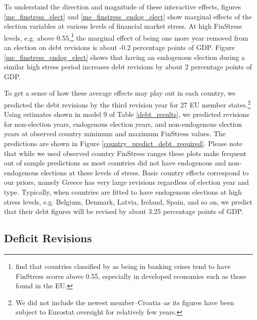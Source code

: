 \documentclass[]{article}
\begin{document}
To understand the direction and magnitude of these interactive effects, figures \ref{me_finstress_elect} and \ref{me_finstress_endog_elect} show marginal effects of the election variables at various levels of financial market stress. At high FinStress levels, e.g. above 0.55,\footnote{\cite{finstress_paper} find that countries classified by \cite{Laeven2012} as being in banking crises tend to have FinStress scores above 0.55, especially in developed economies such as those found in the EU.} the marginal effect of being one more year removed from an election on debt revisions is about -0.2 percentage points of GDP. Figure \ref{me_finstress_endog_elect} shows that having an endogenous election during a similar high stress period increases debt revisions by about 2 percentage points of GDP.

To get a sense of how these average effects may play out in each country, we predicted the debt revisions by the third revision year for 27 EU member states.\footnote{We did not include the newest member--Croatia--as its figures have been subject to Eurostat oversight for relatively few years.} Using estimates shown in model 9 of Table \ref{debt_results}, we predicted revisions for non-election years, endogenous election years, and non-endogenous election years at observed country minimum and maximum FinStress values. The predictions are shown in Figure \ref{country_predict_debt_required}. Please note that while we used observed country FinStress ranges these plots make frequent out of sample predictions as most countries did not have endogenous and non-endogenous elections at these levels of stress. Basic country effects correspond to our priors, namely Greece has very large revisions regardless of election year and type. Typically, when countries are fitted to have endogenous elections at high stress levels, e.g. Belgium, Denmark, Latvia, Ireland, Spain, and so on, we predict that their debt figures will be revised by about 3.25 percentage points of GDP.

\subsection{Deficit Revisions}
\end{document}
